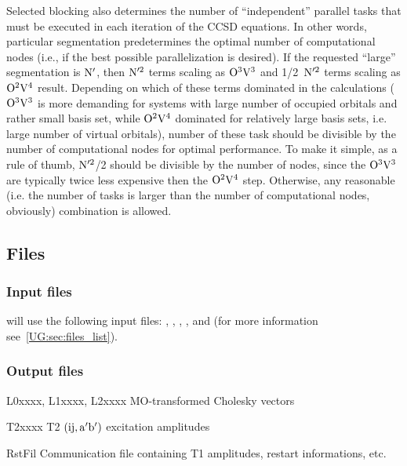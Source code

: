 Selected blocking also determines the
number of ``independent'' parallel tasks that must be executed in each iteration of
the CCSD equations. In other words, particular segmentation predetermines the optimal
number of computational nodes (i.e., if the best possible parallelization is desired).
If the requested ``large'' segmentation is $\rm N'$, then $\rm N'^2$ terms scaling as
$\rm O^3V^3$ and 1/2~$\rm N'^2$ terms scaling as $\rm O^2V^4$ result.
Depending on which of these terms dominated in the calculations ($\rm O^3V^3$
is more demanding for systems with large number of occupied orbitals and rather small
basis set, while $\rm O^2V^4$ dominated for relatively large basis sets,
i.e. large number of virtual orbitals), number of these task should be divisible by the number of
computational nodes for optimal performance. To make it simple, as a rule of thumb, $\rm N'^2$/2
should be divisible by the number of nodes, since the $\rm O^3V^3$ are typically twice less
expensive then the $\rm O^2V^4$ step. Otherwise, any reasonable (i.e. the number
of tasks is larger than the number of computational nodes, obviously) combination is allowed.

\subsection{Files}
\label{sec:chcc_files}

\subsubsection{Input files}
 will use the following input
files: , , , ,
and 
(for more information see~\ref{UG:sec:files_list}).

\subsubsection{Output files}

\begin{filelist}
\item[L0xxxx, L1xxxx, L2xxxx]
MO-transformed Cholesky vectors
\item[T2xxxx]
T2 $\rm (ij,a'b')$ excitation amplitudes
\item[RstFil]
Communication file containing T1 amplitudes, restart informations, etc.
\end{filelist}

